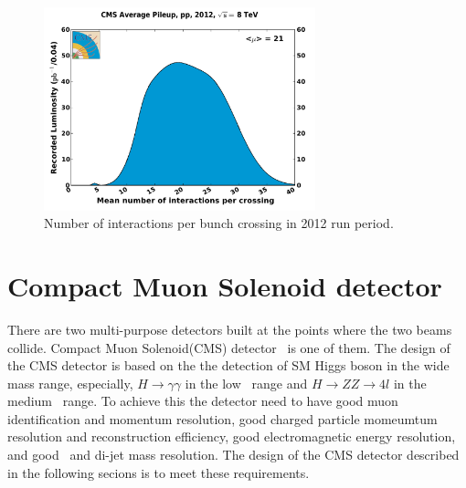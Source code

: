 %
\begin{figure}[ht!] 
\centering 
\includegraphics[width=0.7\textwidth]{figures/pileup_pp_2012.pdf}
\caption{Number of interactions per bunch crossing in 2012 run period.} 
\label{fig:pileup2012} 
\end{figure} 


\section{Compact Muon Solenoid detector} 


There are two multi-purpose detectors built at the points where 
the two beams collide. Compact Muon Solenoid(CMS) detector~\cite{cmstdr1} is one of them. 
The design of the CMS detector is based on the the detection of SM Higgs boson
in the wide mass range, especially, $H \rightarrow \gamma\gamma$ in the low \mHi\ range 
and $H \rightarrow ZZ \rightarrow 4l$ in the medium \mHi\ range. 
To achieve this the detector need to have good muon identification and momentum resolution, 
good charged particle momeumtum resolution and reconstruction efficiency, 
good electromagnetic energy resolution, and good \met\ and di-jet mass resolution. 
The design of the CMS detector described in the following secions 
is to meet these requirements. 

